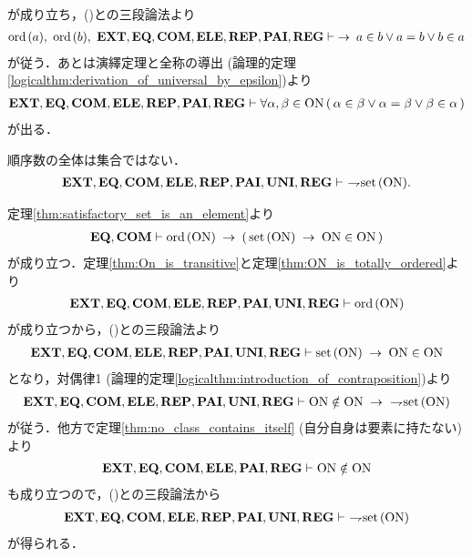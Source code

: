 \begin{sketch}
\begin{description}
\begin{align}
				\end{align}
				が成り立ち，()との三段論法より
				\begin{align}
					\ord{a},\ \ord{b},\ \EXTAX,\EQAX,\COMAX,\ELEAX,\REPAX,\PAIAX,\REGAX \vdash 
					\rarrow a \in b \vee a = b \vee b \in a
				\end{align}
				が従う．あとは演繹定理と全称の導出
				(論理的定理\ref{logicalthm:derivation_of_universal_by_epsilon})より
				\begin{align}
					\mbox{{\bf EXT}},\mbox{{\bf EQ}},\mbox{\bf COM},\mbox{{\bf ELE}},\mbox{{\bf REP}},\mbox{{\bf PAI}},\mbox{{\bf REG}} \vdash 
					\forall \alpha,\beta \in \mathrm{ON}\, (\, \alpha \in \beta \vee \alpha = \beta \vee \beta \in \alpha\, )
				\end{align}
				が出る．
				\QED
		\end{description}
	\end{sketch}
	
	\begin{screen}
		\begin{thm}\label{thm:Burali_Forti}
			順序数の全体は集合ではない．
			\begin{align}
				\mbox{{\bf EXT}},\mbox{{\bf EQ}},\mbox{\bf COM},\mbox{{\bf ELE}},\mbox{{\bf REP}},\mbox{{\bf PAI}},\mbox{{\bf UNI}},\mbox{{\bf REG}}
				\vdash\ \rightharpoondown\hspace{-0.25em} \operatorname*{set}\hspace{0.15em}(\mathrm{ON}).
			\end{align}
		\end{thm}
	\end{screen}
	
	\begin{prf}
		定理\ref{thm:satisfactory_set_is_an_element}より
		\begin{align}
			\EQAX,\COMAX \vdash \ord{\ON} \rarrow (\, \set{\ON} \rarrow \ON \in \ON\, )
			\label{eq:Burali_Forti_1}
		\end{align}
		が成り立つ．定理\ref{thm:On_is_transitive}と定理\ref{thm:ON_is_totally_ordered}より
		\begin{align}
			\mbox{{\bf EXT}},\mbox{{\bf EQ}},\mbox{\bf COM},\mbox{{\bf ELE}},\mbox{{\bf REP}},\mbox{{\bf PAI}},\mbox{{\bf UNI}},\mbox{{\bf REG}}
			\vdash \operatorname*{ord}\hspace{0.15em}(\mathrm{ON})
		\end{align}
		が成り立つから，()との三段論法より
		\begin{align}
			\mbox{{\bf EXT}},\mbox{{\bf EQ}},\mbox{\bf COM},\mbox{{\bf ELE}},\mbox{{\bf REP}},\mbox{{\bf PAI}},\mbox{{\bf UNI}},\mbox{{\bf REG}}
			\vdash \operatorname*{set}\hspace{0.15em}(\mathrm{ON}) \hspace{0.25em}\rightarrow\hspace{0.25em} \mathrm{ON} \in \mathrm{ON}
		\end{align}
		となり，対偶律1 (論理的定理\ref{logicalthm:introduction_of_contraposition})より
		\begin{align}
			\EXTAX,\EQAX,\COMAX,\ELEAX,\REPAX,\PAIAX,\UNIAX,\REGAX
			\vdash \ON \notin \ON \rarrow\ \negation \set{\ON}
			\label{eq:Burali_Forti_2}
		\end{align}
		が従う．他方で定理\ref{thm:no_class_contains_itself} (自分自身は要素に持たない)より
		\begin{align}
			\mbox{{\bf EXT}},\mbox{{\bf EQ}},\mbox{\bf COM},\mbox{{\bf ELE}},\mbox{{\bf PAI}},\mbox{{\bf REG}} \vdash \mathrm{ON} \notin \mathrm{ON}
		\end{align}
		も成り立つので，()との三段論法から
		\begin{align}
			\mbox{{\bf EXT}},\mbox{{\bf EQ}},\mbox{\bf COM},\mbox{{\bf ELE}},\mbox{{\bf REP}},\mbox{{\bf PAI}},\mbox{{\bf UNI}},\mbox{{\bf REG}}
			\vdash\ \rightharpoondown\hspace{-0.25em} \operatorname*{set}\hspace{0.15em}(\mathrm{ON})
		\end{align}
		が得られる．
		\QED
	\end{prf}